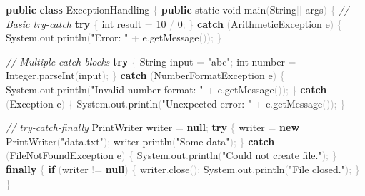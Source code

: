 \documentclass[
  justified,
  openright,
]{tufte-book}
\newcommand{\KeywordTok}[1]{\textcolor{CodeKeyword}{\textbf{#1}}}  %
\newcommand{\StringTok}[1]{\textcolor{CodeString}{#1}}              %
\newcommand{\CommentTok}[1]{\textcolor{CodeComment}{\textit{#1}}}  %
\newcommand{\CodeNumTok}[1]{\textcolor{CodeNumber}{#1}}             %
\newcommand{\CodeFuncTok}[1]{\textcolor{CodeKeyword}{#1}}           %
\newcommand{\CodeTypeTok}[1]{\textcolor{CodeType}{#1}}              %
\newcommand{\OperatorTok}[1]{\textcolor{DarkGray}{#1}}              %
\newenvironment{Shaded}{%
  \begin{mdframed}[style=TufteCode]%
}{%
  \end{mdframed}%
}
\begin{document}
\begin{Shaded}
\begin{Highlighting}[]
\KeywordTok{public} \KeywordTok{class} ExceptionHandling \OperatorTok{\{}
    \KeywordTok{public} \CodeTypeTok{static} \CodeTypeTok{void} \CodeFuncTok{main}\OperatorTok{(}String\OperatorTok{[]} args\OperatorTok{)} \OperatorTok{\{}
        \CommentTok{// Basic try{-}catch}
        \KeywordTok{try} \OperatorTok{\{}
            \CodeTypeTok{int} result \OperatorTok{=} \CodeNumTok{10} \OperatorTok{/} \CodeNumTok{0}\OperatorTok{;}
        \OperatorTok{\}} \KeywordTok{catch} \OperatorTok{(}ArithmeticException e\OperatorTok{)} \OperatorTok{\{}
            System\OperatorTok{.}\CodeFuncTok{out}\OperatorTok{.}\CodeFuncTok{println}\OperatorTok{(}\StringTok{"Error: "} \OperatorTok{+} e\OperatorTok{.}\CodeFuncTok{getMessage}\OperatorTok{());}
        \OperatorTok{\}}
 
        \CommentTok{// Multiple catch blocks}
        \KeywordTok{try} \OperatorTok{\{}
            String input \OperatorTok{=} \StringTok{"abc"}\OperatorTok{;}
            \CodeTypeTok{int} number \OperatorTok{=} Integer\OperatorTok{.}\CodeFuncTok{parseInt}\OperatorTok{(}input\OperatorTok{);}
        \OperatorTok{\}} \KeywordTok{catch} \OperatorTok{(}NumberFormatException e\OperatorTok{)} \OperatorTok{\{}
            System\OperatorTok{.}\CodeFuncTok{out}\OperatorTok{.}\CodeFuncTok{println}\OperatorTok{(}\StringTok{"Invalid number format: "} \OperatorTok{+} e\OperatorTok{.}\CodeFuncTok{getMessage}\OperatorTok{());}
        \OperatorTok{\}} \KeywordTok{catch} \OperatorTok{(}Exception e\OperatorTok{)} \OperatorTok{\{}
            System\OperatorTok{.}\CodeFuncTok{out}\OperatorTok{.}\CodeFuncTok{println}\OperatorTok{(}\StringTok{"Unexpected error: "} \OperatorTok{+} e\OperatorTok{.}\CodeFuncTok{getMessage}\OperatorTok{());}
        \OperatorTok{\}}
 
        \CommentTok{// try{-}catch{-}finally}
        PrintWriter writer \OperatorTok{=} \KeywordTok{null}\OperatorTok{;}
        \KeywordTok{try} \OperatorTok{\{}
            writer \OperatorTok{=} \KeywordTok{new} PrintWriter\OperatorTok{(}\StringTok{"data.txt"}\OperatorTok{);}
            writer\OperatorTok{.}\CodeFuncTok{println}\OperatorTok{(}\StringTok{"Some data"}\OperatorTok{);}
        \OperatorTok{\}} \KeywordTok{catch} \OperatorTok{(}FileNotFoundException e\OperatorTok{)} \OperatorTok{\{}
            System\OperatorTok{.}\CodeFuncTok{out}\OperatorTok{.}\CodeFuncTok{println}\OperatorTok{(}\StringTok{"Could not create file."}\OperatorTok{);}
        \OperatorTok{\}} \KeywordTok{finally} \OperatorTok{\{}
            \KeywordTok{if} \OperatorTok{(}writer \OperatorTok{!=} \KeywordTok{null}\OperatorTok{)} \OperatorTok{\{}
                writer\OperatorTok{.}\CodeFuncTok{close}\OperatorTok{();}
                System\OperatorTok{.}\CodeFuncTok{out}\OperatorTok{.}\CodeFuncTok{println}\OperatorTok{(}\StringTok{"File closed."}\OperatorTok{);}
            \OperatorTok{\}}
        \OperatorTok{\}}
 

\end{Highlighting}
\end{Shaded}
\end{document}
